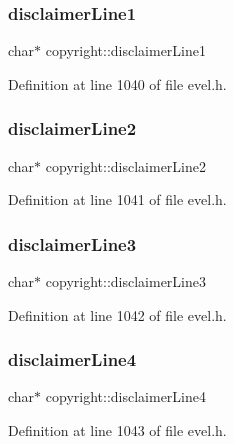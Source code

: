 \subsubsection{\texorpdfstring{disclaimer\+Line1}{disclaimerLine1}}
{\footnotesize\ttfamily char$\ast$ copyright\+::disclaimer\+Line1}



Definition at line 1040 of file evel.\+h.

\hypertarget{structcopyright_a3bf2ec025b45fb514675edee7472779c}{}\label{structcopyright_a3bf2ec025b45fb514675edee7472779c} 
\subsubsection{\texorpdfstring{disclaimer\+Line2}{disclaimerLine2}}
{\footnotesize\ttfamily char$\ast$ copyright\+::disclaimer\+Line2}



Definition at line 1041 of file evel.\+h.

\hypertarget{structcopyright_ad44f81bfbe8b699f6cdbf898b7a85def}{}\label{structcopyright_ad44f81bfbe8b699f6cdbf898b7a85def} 
\subsubsection{\texorpdfstring{disclaimer\+Line3}{disclaimerLine3}}
{\footnotesize\ttfamily char$\ast$ copyright\+::disclaimer\+Line3}



Definition at line 1042 of file evel.\+h.

\hypertarget{structcopyright_ab0d41c9fae081c4e2bbfd32da2e709dd}{}\label{structcopyright_ab0d41c9fae081c4e2bbfd32da2e709dd} 
\subsubsection{\texorpdfstring{disclaimer\+Line4}{disclaimerLine4}}
{\footnotesize\ttfamily char$\ast$ copyright\+::disclaimer\+Line4}



Definition at line 1043 of file evel.\+h.

